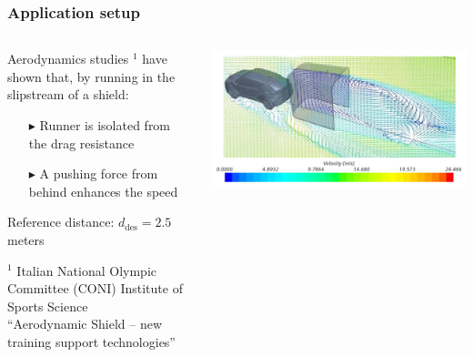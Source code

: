 \documentclass[9pt, aspectratio=169]{beamer}
\begin{document}
\begin{frame}[t]
\frametitle{Application setup}

\vspace{-0.2cm}
\begin{columns}
\begin{column}{0.67\textwidth}
Aerodynamics studies $^1$ have shown that, by running in the slipstream of a shield:
\begin{itemize}
	\footnotesize
	\item[$\blacktriangleright$] Runner is isolated from the drag resistance
	\item[$\blacktriangleright$] A pushing force from behind enhances the speed
\end{itemize}
\vspace{0.3cm}
Reference distance: $d_\text{des} = 2.5$ meters
\vspace{0.3cm}


{\color{gray} \scriptsize 
$^1$ Italian National Olympic Committee (CONI) Institute of Sports Science \\
\hspace{0.2cm} “Aerodynamic Shield – new training support technologies”}
\end{column}
\begin{column}{0.32\textwidth}
	\begin{center}
  		\hspace{-0.9cm}\includegraphics[width=1.2\textwidth]{Aerodynamics} 
	\end{center}
\end{column}
\end{columns}


\end{frame}
\end{document}
